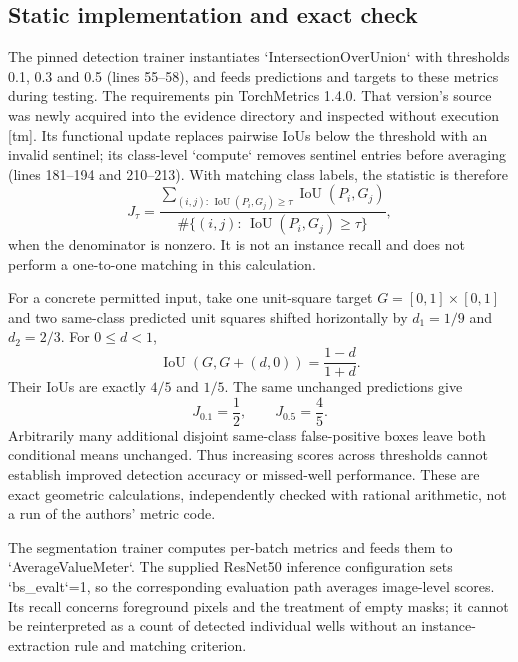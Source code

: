 \documentclass[10pt]{article}
\begin{document}
\subsection*{Static implementation and exact check}
The pinned detection trainer instantiates `IntersectionOverUnion` with thresholds 0.1, 0.3 and 0.5 (lines 55–58), and feeds predictions and targets to these metrics during testing. The requirements pin TorchMetrics 1.4.0. That version’s source was newly acquired into the evidence directory and inspected without execution [tm]. Its functional update replaces pairwise IoUs below the threshold with an invalid sentinel; its class-level `compute` removes sentinel entries before averaging (lines 181–194 and 210–213). With matching class labels, the statistic is therefore \[J_\tau=
 \frac{\sum_{(i,j):\,\operatorname{IoU}(P_i,G_j)\ge\tau}
       \operatorname{IoU}(P_i,G_j)}
      {\#\{(i,j):\,\operatorname{IoU}(P_i,G_j)\ge\tau\}},\] when the denominator is nonzero. It is not an instance recall and does not perform a one-to-one matching in this calculation.\par
For a concrete permitted input, take one unit-square target \(G=[0,1]\times[0,1]\) and two same-class predicted unit squares shifted horizontally by \(d_1=1/9\) and \(d_2=2/3\). For \(0\le d<1\), \[\operatorname{IoU}(G,G+(d,0))=\frac{1-d}{1+d}.\] Their IoUs are exactly \(4/5\) and \(1/5\). The same unchanged predictions give \[J_{0.1}=\frac12,\qquad J_{0.5}=\frac45.\] Arbitrarily many additional disjoint same-class false-positive boxes leave both conditional means unchanged. Thus increasing scores across thresholds cannot establish improved detection accuracy or missed-well performance. These are exact geometric calculations, independently checked with rational arithmetic, not a run of the authors’ metric code.\par
The segmentation trainer computes per-batch metrics and feeds them to `AverageValueMeter`. The supplied ResNet50 inference configuration sets `bs\_evalt`=1, so the corresponding evaluation path averages image-level scores. Its recall concerns foreground pixels and the treatment of empty masks; it cannot be reinterpreted as a count of detected individual wells without an instance-extraction rule and matching criterion.\par
\end{document}
